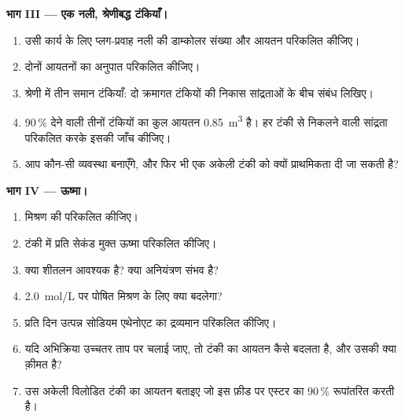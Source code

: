 \begin{problem}
\medskip
\noindent\textbf{भाग III --- एक नली, श्रेणीबद्ध टंकियाँ।}
\begin{enumerate}[resume]
  \item उसी कार्य के लिए प्लग-प्रवाह नली की डाम्कोलर संख्या और आयतन
        परिकलित कीजिए।
  \item दोनों आयतनों का अनुपात परिकलित कीजिए।
  \item श्रेणी में तीन समान टंकियाँ: दो क्रमागत टंकियों की निकास सांद्रताओं
        के बीच संबंध लिखिए।
  \item 90\,\% देने वाली तीनों टंकियों का कुल आयतन
        \qty{0.85}{m^3} है। हर टंकी से निकलने वाली सांद्रता परिकलित करके इसकी
        जाँच कीजिए।
  \item आप कौन-सी व्यवस्था बनाएँगे, और फिर भी एक अकेली टंकी को क्यों
        प्राथमिकता दी जा सकती है?
\end{enumerate}

\medskip
\noindent\textbf{भाग IV --- ऊष्मा।}
\begin{enumerate}[resume]
  \item मिश्रण की  परिकलित कीजिए।
  \item टंकी में प्रति सेकंड मुक्त ऊष्मा परिकलित कीजिए।
  \item क्या शीतलन आवश्यक है? क्या अनियंत्रण संभव है?
  \item \qty{2.0}{mol/L} पर पोषित मिश्रण के लिए क्या बदलेगा?
  \item प्रति दिन उत्पन्न सोडियम एथेनोएट का द्रव्यमान परिकलित कीजिए।
  \item यदि अभिक्रिया उच्चतर ताप पर चलाई जाए, तो टंकी का आयतन कैसे
        बदलता है, और उसकी क्या क़ीमत है?
  \item उस अकेली विलोडित टंकी का आयतन बताइए जो इस फ़ीड पर एस्टर का 90\,\%
        रूपांतरित करती है।
\end{enumerate}
\end{problem}
